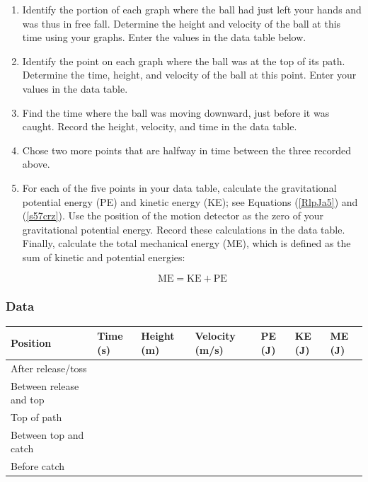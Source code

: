 \documentclass{article}
\numberwithin{equation}{section}
\numberwithin{figure}{section}
\begin{document}
\begin{enumerate}
\setlength\itemsep{-1ex}
    \item Identify the portion of each graph where the ball had just left your hands and was thus in free fall. Determine the height and velocity of the ball at this time using your graphs. Enter the values in the data table below.
    \item Identify the point on each graph where the ball was at the top of its path. Determine the time, height, and velocity of the ball at this point. Enter your values in the data table.
    \item Find the time where the ball was moving downward, just before it was caught. Record the height, velocity, and time in the data table.
    \item Chose two more points that are halfway in time between the three recorded above. 
    \item For each of the five points in your data table, calculate the gravitational potential energy (PE) and kinetic energy (KE); see Equations (\ref{RlpJa5}) and (\ref{s57crz}). Use the position of the motion detector as the zero of your gravitational potential energy. Record these calculations in the data table. Finally, calculate the total mechanical energy (ME), which is defined as the sum of kinetic and potential energies:

    \begin{equation}
        \mathrm{ME} = \mathrm{KE} + \mathrm{PE}
    \end{equation}
\end{enumerate}

\subsubsection*{Data}
\def\mycolwidth{1.55cm}

\vspace{1ex}
\begin{tabular}{|m{4cm}|m{\mycolwidth}|m{\mycolwidth}|m{\mycolwidth}|m{\mycolwidth}|m{\mycolwidth}|m{\mycolwidth}|}
    \hline
    \textbf{Position} & \textbf{Time} (s) & \textbf{Height} (m) & \textbf{Velocity} (m/s) & \textbf{PE} (J) & \textbf{KE} (J) & \textbf{ME} (J)\\
    \hline
    After release/toss & & & & & & \\[0.5ex]
    \hline
    Between release and top & & & & & & \\[0.5ex]
    \hline
    Top of path & & & & & & \\[0.5ex]
    \hline
    Between top and catch & & & & & & \\[0.5ex]
    \hline
    Before catch & & & & & & \\[0.5ex]
    \hline
\end{tabular}
\end{document}

